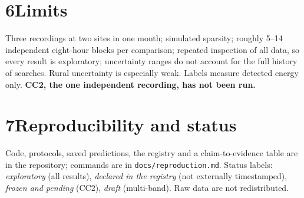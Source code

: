 \documentclass[10pt,a4paper]{article}
\begin{document}
\section*{6\quad Limits}
Three recordings at two sites in one month; simulated sparsity; roughly 5--14 independent eight-hour blocks per comparison; repeated
inspection of all data, so every result is exploratory; uncertainty ranges do not account for the full history of searches. Rural
uncertainty is especially weak. Labels measure detected energy only. \textbf{CC2, the one independent recording, has not been run.}

\section*{7\quad Reproducibility and status}
Code, protocols, saved predictions, the registry and a claim-to-evidence table are in the repository; commands are in
\texttt{docs/reproduction.md}. Status labels: \emph{exploratory} (all results), \emph{declared in the registry} (not externally timestamped),
\emph{frozen and pending} (CC2), \emph{draft} (multi-band). Raw data are not redistributed.
\end{document}
